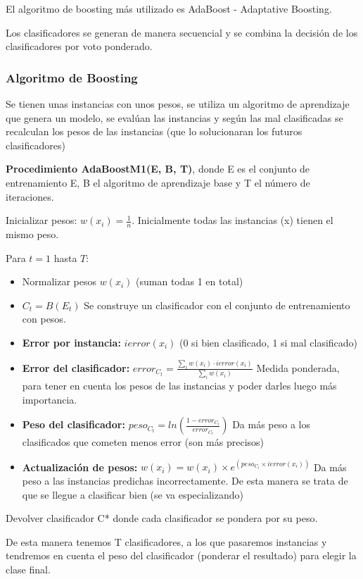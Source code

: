 \documentclass[12pt, twoside, openright]{report} %
\begin{document}
El algoritmo de boosting más utilizado es AdaBoost - Adaptative Boosting.

Los clasificadores se generan de manera secuencial y se combina la decisión de los clasificadores por voto ponderado.
\subsubsection{Algoritmo de Boosting}

Se tienen unas instancias con unos pesos, se utiliza un algoritmo de aprendizaje que genera un modelo, se evalúan las instancias y según las mal clasificadas se recalculan los pesos de las instancias (que lo solucionaran los futuros clasificadores)

\textbf{Procedimiento AdaBoostM1(E, B, T)}, donde E es el conjunto de entrenamiento E, B el algoritmo de aprendizaje base y T el número de iteraciones.

Inicializar pesos: $w(x_i) = \frac 1 n$. Inicialmente todas las instancias (x) tienen el mismo peso.

Para $t = 1$ hasta $T$:
\begin{itemize}
	\item Normalizar pesos $w(x_i)$ (suman todas 1 en total)
	\item $C_t = B(E_t)$ Se construye un clasificador con el conjunto de entrenamiento con pesos.
	\item \textbf{Error por instancia:} $ierror(x_i)$ (0 si bien clasificado, 1 si mal clasificado)
	\item \textbf{Error del clasificador:} $error_{C_t} = \frac {\sum_i w(x_i)\cdot ierror(x_i)} {\sum_i w(x_i)}$ Medida ponderada, para tener en cuenta los pesos de las instancias y poder darles luego más importancia.
	\item \textbf{Peso del clasificador:} $peso_{C_t} = ln \left( \frac{1-error_{C_t}}{error_{C_t}} \right)$ Da más peso a los clasificados que cometen menos error (son más precisos)
	\item \textbf{Actualización de pesos:} $w(x_i) = w(x_i) \times e^{(peso_{C_t} \times ierror(x_i))}$ Da más peso a las instancias predichas incorrectamente. De esta manera se trata de que se llegue a clasificar bien (se va especializando)
\end{itemize}
Devolver clasificador C* donde cada clasificador se pondera por su peso.

De esta manera tenemos T clasificadores, a los que pasaremos instancias y tendremos en cuenta el peso del clasificador (ponderar el resultado) para elegir la clase final.
\end{document}
